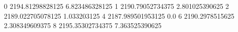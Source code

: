 0 2194.81298828125 6.823486328125
1 2190.79052734375 2.801025390625
2 2189.022705078125 1.033203125
4 2187.989501953125 0.0
6 2190.2978515625 2.308349609375
8 2195.35302734375 7.363525390625
